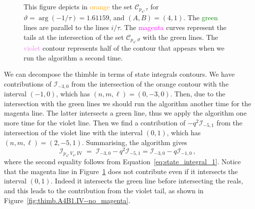 \documentclass[12pt,reqno]{amsart}
\theoremstyle{definition}
\def\calI{\mathcal I}
\def\calC{\mathcal C}
\def\be{\begin{equation}}
\def\ee{\end{equation}}
\renewcommand{\=}{\;=\;}
\begin{document}
\begin{figure}[ht]
\begin{tiny}
\end{tiny}
\caption{This figure depicts in \textcolor{orange}{orange} the set $\calC_{p_4,\tau}$ for $\vartheta=\arg(-1/\tau)=1.61159$, and $(A,B)=(4,1)$. The \textcolor{green}{green} lines are parallel to the lines $i/\tau$. The \textcolor{magenta}{magenta} curves represent the tails at the intersection of the set $\calC_{p_4,\vartheta}$ with the green lines. The \textcolor{violet}{violet} contour represents half of the contour that appears when we run the algorithm a second time.}
\label{fig:thimb.A4B1.IV}
\end{figure}
We can decompose the thimble in terms of state integrals contours. We have contributions of $\calI_{-3,0}$ from the intersection of the orange contour with the interval $(-1,0)$, which has $(n,m,\ell)=(0,-3,0)$. Then, due to the intersection with the green lines we should run the algorithm another time for the magenta line. The latter intersects a green line, thus we apply the algorithm one more time for the violet line. Then we find a contribution of $-q^2\calI_{-5,1}$ from the intersection of the violet line with the interval $(0,1)$, which has $(n,m,\ell)=(2,-5,1)$. Summarising, the algorithm gives
\be\label{eq:region_IV_A4B1}
\calI_{p_4,V_4,\mathrm{IV}}
\=
\calI_{-3,0}-q^2\calI_{-5,1}=\calI_{-3,0}-q\calI_{-1,0}\,,
\ee
where the second equality follows from Equation~\eqref{eq:state_integral_1}. Notice that the magenta line in Figure~\ref{fig:thimb.A4B1.IV} does not contribute even if it intersects the interval $(0,1)$. Indeed it intersects the green line before intersecting the reals, and this leads to the contribution from the violet tail, as shown in Figure~\ref{fig:thimb.A4B1.IV--no_magenta}.
\end{document}
